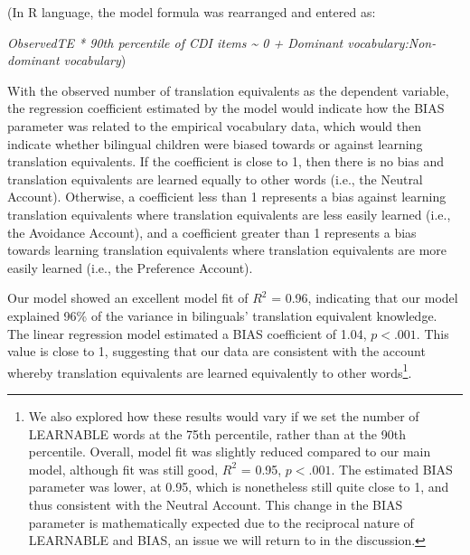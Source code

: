 \documentclass[
  english,
  ,man,floatsintext]{apa6}
\begin{document}
\noindent (In R language, the model formula was rearranged and entered as:

\emph{ObservedTE * 90th percentile of CDI items \textasciitilde{} 0 + Dominant vocabulary:Non-dominant vocabulary})

\noindent With the observed number of translation equivalents as the dependent variable, the regression coefficient estimated by the model would indicate how the BIAS parameter was related to the empirical vocabulary data, which would then indicate whether bilingual children were biased towards or against learning translation equivalents. If the coefficient is close to 1, then there is no bias and translation equivalents are learned equally to other words (i.e., the Neutral Account). Otherwise, a coefficient less than 1 represents a bias against learning translation equivalents where translation equivalents are less easily learned (i.e., the Avoidance Account), and a coefficient greater than 1 represents a bias towards learning translation equivalents where translation equivalents are more easily learned (i.e., the Preference Account).

Our model showed an excellent model fit of \(R^2\) = 0.96, indicating that our model explained 96\% of the variance in bilinguals' translation equivalent knowledge. The linear regression model estimated a BIAS coefficient of 1.04, \(p < .001\). This value is close to 1, suggesting that our data are consistent with the account whereby translation equivalents are learned equivalently to other words\footnote{We also explored how these results would vary if we set the number of LEARNABLE words at the 75th percentile, rather than at the 90th percentile. Overall, model fit was slightly reduced compared to our main model, although fit was still good, \(R^2\) = 0.95, \(p < .001\). The estimated BIAS parameter was lower, at 0.95, which is nonetheless still quite close to 1, and thus consistent with the Neutral Account. This change in the BIAS parameter is mathematically expected due to the reciprocal nature of LEARNABLE and BIAS, an issue we will return to in the discussion.}.
\end{document}
